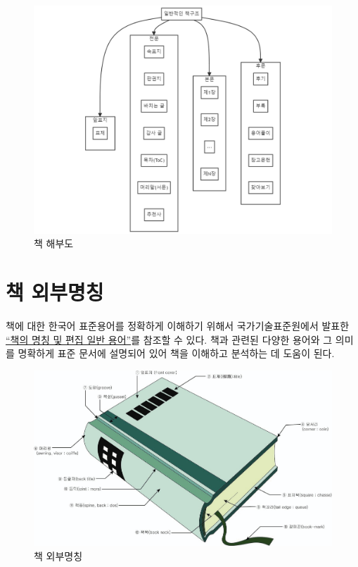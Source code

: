 \documentclass[
  letterpaper,
]{book}
\begin{document}
\begin{figure}

{\centering \includegraphics{images/anatomy_of_book.png}

}

\caption{책 해부도}

\end{figure}

\hypertarget{book-outer-extract}{%
\section{책 외부명칭}\label{book-outer-extract}}

책에 대한 한국어 표준용어를 정확하게 이해하기 위해서 국가기술표준원에서
발표한
\href{(https://www.standard.go.kr/KSCI/standardIntro/getStandardSearchView.do?menuId=919&topMenuId=502&upperMenuId=503&ksNo=KSX0003&tmprKsNo=KSX0003&reformNo=03)}{``책의
명칭 및 편집 일반 용어''}를 참조할 수 있다. 책과 관련된 다양한 용어와 그
의미를 명확하게 표준 문서에 설명되어 있어 책을 이해하고 분석하는 데
도움이 된다.

\begin{figure}

{\centering \includegraphics{images/book_cover.jpeg}

}

\caption{책 외부명칭}

\end{figure}
\end{document}
